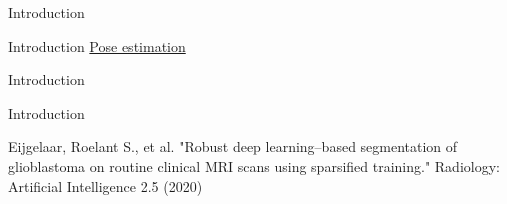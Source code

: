 \documentclass[8pt]{beamer}
\begin{document}
\begin{frame}{Introduction}
		\vfill
	\end{frame}

	\begin{frame}{Introduction} %
		\centering
		\href{https://drive.google.com/file/d/1a__m4HN50WZV1H1b4WqXI4SF6a6T6YMN/view?usp=share_link}{Pose estimation}
	\end{frame}

	\begin{frame}{Introduction} %
		\centering
		\vfill
		\vfill
	\end{frame}

	\begin{frame}{Introduction} %
		\centering
		\vfill
		\vfill
		\tiny{Eijgelaar, Roelant S., et al. "Robust deep learning–based segmentation of glioblastoma on routine clinical MRI scans using sparsified training." Radiology: Artificial Intelligence 2.5 (2020)}
	\end{frame}
\end{document}
